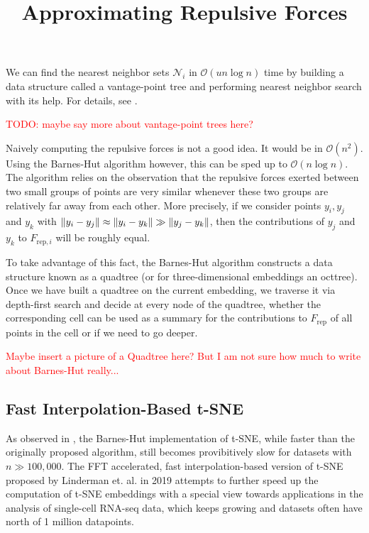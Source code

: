 We can find the nearest neighbor sets $\mathcal{N}_i$ in $\mathcal{O}(u n \log n)$ time by building a data structure called a vantage-point tree and performing nearest neighbor search with its help. For details, see \cite{vdMaa14}. 

\textcolor{red}{TODO: maybe say more about vantage-point trees here?}

\title{Approximating Repulsive Forces}
Naively computing the repulsive forces is not a good idea. It would be in $\mathcal{O}(n^2)$. 
Using the Barnes-Hut algorithm however, this can be sped up to $\mathcal{O}(n \log n)$. 
The algorithm relies on the observation that the repulsive forces exerted between two small groups of points are very similar whenever these two groups are relatively far away from each other. 
More precisely, if we consider points $y_i, y_j$ and $y_k$ with $\lVert y_i - y_j\rVert \approx \lVert y_i - y_k\rVert \gg \lVert y_j - y_k\rVert$, then the contributions of $y_j$ and $y_k$ to $F_{\text{rep}, i}$ will be roughly equal. 

To take advantage of this fact, the Barnes-Hut algorithm constructs a data structure known as a quadtree (or for three-dimensional embeddings an octtree). 
Once we have built a quadtree on the current embedding, we traverse it via depth-first search and decide at every node of the quadtree, whether the corresponding cell can be used as a summary for the contributions to $F_{\text{rep}}$ of all points in the cell or if we need to go deeper. 

\textcolor{red}{Maybe insert a picture of a Quadtree here? But I am not sure how much to write about Barnes-Hut really...}

\subsection{Fast Interpolation-Based t-SNE}
As observed in \cite{KoBe19SingleCell}, the Barnes-Hut implementation of t-SNE, while faster than the originally proposed algorithm, still becomes provibitively slow for datasets with $n \gg 100,000$. 
The FFT accelerated, fast interpolation-based version of t-SNE proposed by Linderman et. al. in 2019 \cite{Lin19} attempts to further speed up the computation of t-SNE embeddings with a special view towards applications in the analysis of single-cell RNA-seq data, which keeps growing and datasets often have north of 1 million datapoints. 

